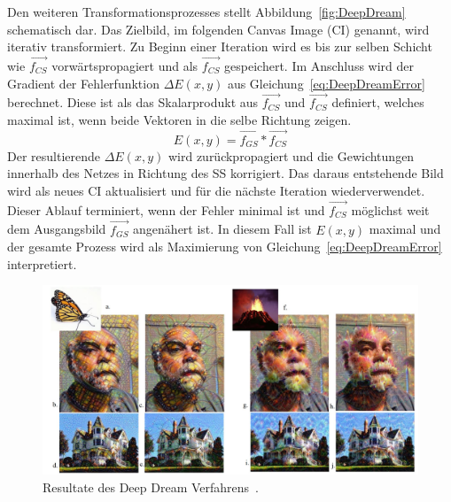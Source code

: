 \documentclass[times, 11pt,twocolumn]{article}
\begin{document}
Den weiteren Transformationsprozesses stellt Abbildung~\ref{fig:DeepDream} schematisch dar. Das Zielbild, im folgenden Canvas Image (CI) genannt, wird iterativ transformiert. Zu Beginn einer Iteration wird es bis zur selben Schicht wie $\vec{f_{CS}}$ vorwärtspropagiert und als $\vec{f_{CS}}$ gespeichert. Im Anschluss wird der Gradient der Fehlerfunktion $\Delta E(x,y)$ aus Gleichung~\ref{eq:DeepDreamError} berechnet. Diese ist als das Skalarprodukt aus $\vec{f_{CS}}$ und $\vec{f_{CS}}$ definiert, welches maximal ist, wenn beide Vektoren in die selbe Richtung zeigen.
\footnotesize
\begin{equation}
E(x,y)= \vec{f_{GS}}* \vec{f_{CS}}
\label{eq:DeepDreamError}
\end{equation}
\small
Der resultierende  $\Delta E(x,y)$ wird zurückpropagiert und die Gewichtungen innerhalb des Netzes in Richtung des SS korrigiert. Das daraus entstehende Bild wird als neues CI aktualisiert und für die nächste Iteration wiederverwendet.
Dieser Ablauf terminiert, wenn der Fehler minimal ist und $\vec{f_{CS}}$  möglichst weit dem Ausgangsbild $\vec{f_{GS}}$ angenähert ist. In diesem Fall ist $E(x,y)$ maximal und der gesamte Prozess wird als Maximierung von Gleichung~\ref{eq:DeepDreamError} interpretiert.\\

\begin{figure}
	\flushleft
	\includegraphics[width=\columnwidth]{Bilder/DeepDreamResults.JPG}
	\caption{Resultate des Deep Dream Verfahrens~\cite{McCaigDG16}.}
	\label{fig:DeepDreamResults}
\end{figure}
\end{document}
